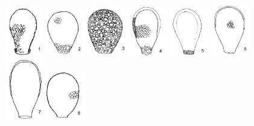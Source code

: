 \documentclass[12pt, a4paper]{article}
\begin{document}
\begin{figure}[h]
    \centering
    \includegraphics[width=0.15\textwidth]{1.png}
    \includegraphics[width=0.15\textwidth]{2.png}
    \includegraphics[width=0.15\textwidth]{3.png}
    \includegraphics[width=0.15\textwidth]{4.png}
    \includegraphics[width=0.15\textwidth]{5.png}
    \includegraphics[width=0.15\textwidth]{6.png}
    \includegraphics[width=0.15\textwidth]{7.png}
    \includegraphics[width=0.15\textwidth]{8.png}

\end{figure}
\end{document}

